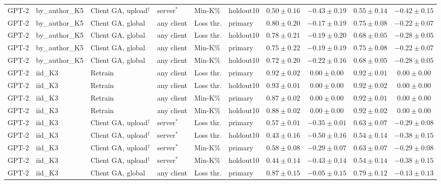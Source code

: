 \begin{table}[t]
\begin{tabular*}{\textwidth}{@{\extracolsep{\fill}}llllllcccc@{}}
GPT-2 & by\_author\_K5 & Client GA, upload$^{\dagger}$ & server$^{*}$ & Min-K\% & holdout10 & $0.50 \pm 0.16$ & $-0.43 \pm 0.19$ & $0.55 \pm 0.14$ & $-0.42 \pm 0.15$ \\
GPT-2 & by\_author\_K5 & Client GA, global & any client & Loss thr. & primary & $0.80 \pm 0.20$ & $-0.17 \pm 0.19$ & $0.75 \pm 0.08$ & $-0.22 \pm 0.07$ \\
GPT-2 & by\_author\_K5 & Client GA, global & any client & Loss thr. & holdout10 & $0.78 \pm 0.21$ & $-0.19 \pm 0.20$ & $0.68 \pm 0.05$ & $-0.28 \pm 0.05$ \\
GPT-2 & by\_author\_K5 & Client GA, global & any client & Min-K\% & primary & $0.75 \pm 0.22$ & $-0.19 \pm 0.19$ & $0.75 \pm 0.08$ & $-0.22 \pm 0.07$ \\
GPT-2 & by\_author\_K5 & Client GA, global & any client & Min-K\% & holdout10 & $0.72 \pm 0.20$ & $-0.22 \pm 0.16$ & $0.68 \pm 0.05$ & $-0.28 \pm 0.05$ \\
GPT-2 & iid\_K3 & Retrain & any client & Loss thr. & primary & $0.92 \pm 0.02$ & $0.00 \pm 0.00$ & $0.92 \pm 0.01$ & $0.00 \pm 0.00$ \\
GPT-2 & iid\_K3 & Retrain & any client & Loss thr. & holdout10 & $0.93 \pm 0.01$ & $0.00 \pm 0.00$ & $0.92 \pm 0.02$ & $0.00 \pm 0.00$ \\
GPT-2 & iid\_K3 & Retrain & any client & Min-K\% & primary & $0.87 \pm 0.02$ & $0.00 \pm 0.00$ & $0.92 \pm 0.01$ & $0.00 \pm 0.00$ \\
GPT-2 & iid\_K3 & Retrain & any client & Min-K\% & holdout10 & $0.88 \pm 0.02$ & $0.00 \pm 0.00$ & $0.92 \pm 0.02$ & $0.00 \pm 0.00$ \\
GPT-2 & iid\_K3 & Client GA, upload$^{\dagger}$ & server$^{*}$ & Loss thr. & primary & $0.57 \pm 0.01$ & $-0.35 \pm 0.01$ & $0.63 \pm 0.07$ & $-0.29 \pm 0.08$ \\
GPT-2 & iid\_K3 & Client GA, upload$^{\dagger}$ & server$^{*}$ & Loss thr. & holdout10 & $0.43 \pm 0.16$ & $-0.50 \pm 0.16$ & $0.54 \pm 0.14$ & $-0.38 \pm 0.15$ \\
GPT-2 & iid\_K3 & Client GA, upload$^{\dagger}$ & server$^{*}$ & Min-K\% & primary & $0.58 \pm 0.08$ & $-0.29 \pm 0.07$ & $0.63 \pm 0.07$ & $-0.29 \pm 0.08$ \\
GPT-2 & iid\_K3 & Client GA, upload$^{\dagger}$ & server$^{*}$ & Min-K\% & holdout10 & $0.44 \pm 0.14$ & $-0.43 \pm 0.14$ & $0.54 \pm 0.14$ & $-0.38 \pm 0.15$ \\
GPT-2 & iid\_K3 & Client GA, global & any client & Loss thr. & primary & $0.87 \pm 0.15$ & $-0.05 \pm 0.15$ & $0.79 \pm 0.12$ & $-0.13 \pm 0.13$ \\

\end{tabular*}
\end{table}
